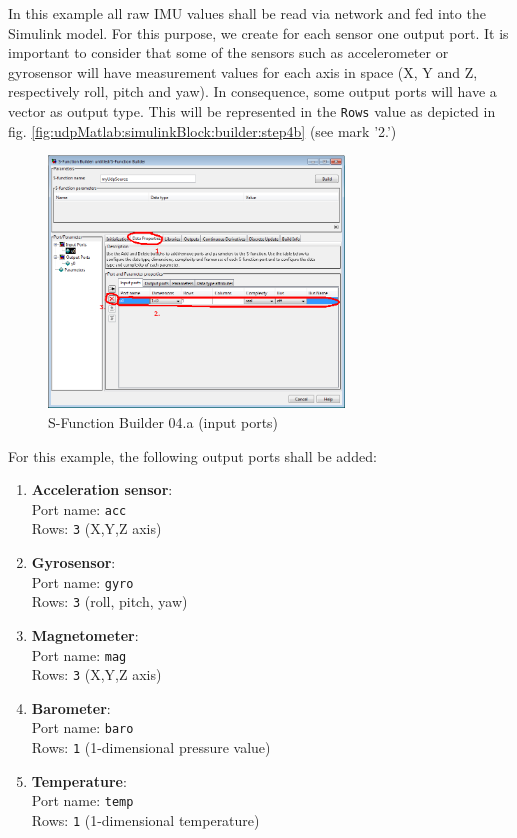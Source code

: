 In this example all raw IMU values shall be read via network and fed into the Simulink model. For this purpose, we create for each sensor one output port. It is important to consider that some of the sensors such as accelerometer or gyrosensor will have measurement values for each axis in space (X, Y and Z, respectively roll, pitch and yaw). In consequence, some output ports will have a vector as output type. This will be represented in the \texttt{Rows} value as depicted in fig. \ref{fig:udpMatlab:simulinkBlock:builder:step4b} (see mark '2.')

\begin{figure}[H]
    \centering
    \includegraphics[width=0.7\textwidth]{fig/ch-matlab-lib/sFuncBuilder_matlabModel_01}
    \caption{S-Function Builder 04.a (input ports)}
    \label{fig:udpMatlab:simulinkBlock:builder:step4a}
\end{figure}

For this example, the following output ports shall be added:
\begin{enumerate}
	\item \textbf{Acceleration sensor}:\\
	Port name: \texttt{acc}\\
	Rows:	\texttt{3} (X,Y,Z axis)
	
	\item \textbf{Gyrosensor}:\\
	Port name: \texttt{gyro}\\
	Rows:	\texttt{3} (roll, pitch, yaw)
	
	\item \textbf{Magnetometer}:\\
	Port name: \texttt{mag}\\
	Rows:	\texttt{3} (X,Y,Z axis)
	
	\item \textbf{Barometer}:\\
	Port name: \texttt{baro}\\
	Rows:	\texttt{1} (1-dimensional pressure value)
	
	\item \textbf{Temperature}:\\
	Port name: \texttt{temp}\\
	Rows:	\texttt{1} (1-dimensional temperature)
\end{enumerate}

